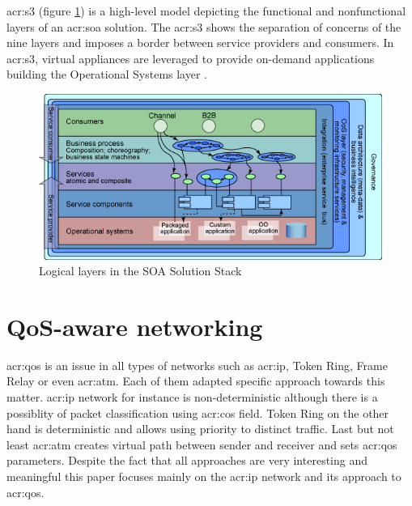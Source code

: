 \documentclass[11pt,openany]{book}
\begin{document}
        \gls{acr:s3} (figure \ref{fig:ctx:soa-stack}) is a high-level model depicting the functional and nonfunctional
        layers of an \gls{acr:soa} solution.  The \gls{acr:s3} shows the separation of concerns of the nine layers and
        imposes a border between service providers and consumers. In \gls{acr:s3}, virtual appliances are leveraged to
        provide on-demand applications building the Operational Systems layer \cite{soa-stack}.

        \begin{figure}[h]
          \begin{center}
            \includegraphics[scale=.5]{img/ctx/soa-stack.png}
          \end{center}


          \caption{Logical layers in the SOA Solution Stack}
          \label{fig:ctx:soa-stack}
        \end{figure}


    \section{QoS-aware networking}
    \label{sec:ctx:qos}

      \gls{acr:qos} is an issue in all types of networks such as \gls{acr:ip}, Token Ring, Frame Relay or even
      \gls{acr:atm}.  Each of them adapted specific approach towards this matter. \gls{acr:ip} network for instance is
      non-deterministic although there is a possiblity of packet classification using \gls{acr:cos} field. Token Ring on
      the other hand is deterministic and allows using priority to distinct traffic. Last but not least \gls{acr:atm}
      creates virtual path between sender and receiver and sets \gls{acr:qos} parameters. Despite the fact that all
      approaches are very interesting and meaningful this paper focuses mainly on the \gls{acr:ip} network and its
      approach to \gls{acr:qos}.
\end{document}
